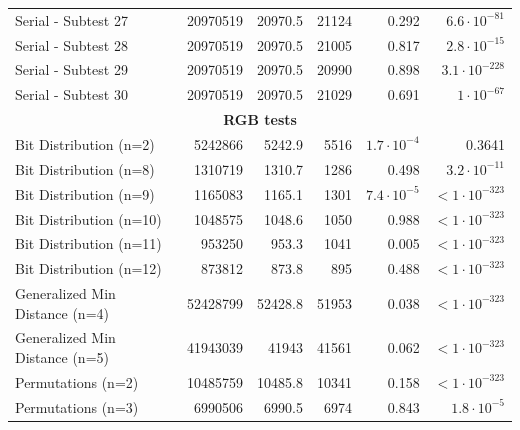 \documentclass[
	digital,    %
	oneside,
	color,
	11pt,
	nocover,
	notable,
	nolof,
	nolot,
]{fithesis3}
\newcommand{\rd}{\cellcolor{red!40}}
\theoremstyle{definition}
\theoremstyle{remark}
\begin{document}
\begin{table}[H]
\begin{nomar}
{\begin{tabular}{@{}lrrrrr@{}}
Serial - Subtest 27            & 20970519          & 20970.5       & 21124         & 0.292                  & $6.6 \cdot 10^{-81}$  \rd \\
Serial - Subtest 28            & 20970519          & 20970.5       & 21005         & 0.817                  & $2.8 \cdot 10^{-15}$  \rd \\
Serial - Subtest 29            & 20970519          & 20970.5       & 20990         & 0.898                  & $3.1 \cdot 10^{-228}$ \rd \\
Serial - Subtest 30            & 20970519          & 20970.5       & 21029         & 0.691                  & $1 \cdot 10^{-67}$    \rd \\ \midrule
\multicolumn{6}{c}{\textbf{RGB tests}} \\ \midrule
Bit Distribution (n=2)         & 5242866           & 5242.9        & 5516          & $1.7\cdot 10^{-4}$ \rd & 0.3641                \\
Bit Distribution (n=8)         & 1310719           & 1310.7        & 1286          & 0.498                  & $3.2 \cdot 10^{-11}$  \rd \\
Bit Distribution (n=9)         & 1165083           & 1165.1        & 1301          & $7.4\cdot 10^{-5}$ \rd & $<1\cdot 10^{-323}$   \rd \\
Bit Distribution (n=10)        & 1048575           & 1048.6        & 1050          & 0.988                  & $<1\cdot 10^{-323}$   \rd \\
Bit Distribution (n=11)        & 953250            & 953.3         & 1041          & 0.005                  & $<1\cdot 10^{-323}$   \rd \\
Bit Distribution (n=12)        & 873812            & 873.8         & 895           & 0.488                  & $<1\cdot 10^{-323}$   \rd \\
Generalized Min Distance (n=4) & 52428799          & 52428.8       & 51953         & 0.038                  & $<1\cdot 10^{-323}$   \rd \\
Generalized Min Distance (n=5) & 41943039          & 41943         & 41561         & 0.062                  & $<1\cdot 10^{-323}$   \rd \\
Permutations (n=2)             & 10485759          & 10485.8       & 10341         & 0.158                  & $<1\cdot 10^{-323}$   \rd \\
Permutations (n=3)             & 6990506           & 6990.5        & 6974          & 0.843                  & $1.8 \cdot 10^{-5}$   \rd \\

\end{tabular}}
\end{nomar}
\end{table}
\end{document}
